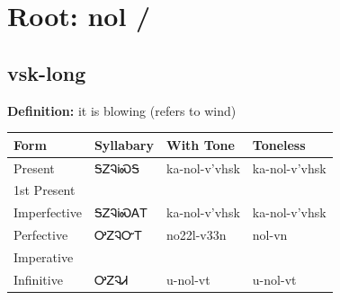 \documentclass{article}%
\begin{document}
%
\normalsize%
\section*{Root: nol / }%
\subsection*{vsk-long}%
\textbf{Definition: }%
it is blowing (refers to wind)%
\\[0.5em]%
\begin{tabular}{|l|l|l|l|}%
\hline%
\textbf{Form}&\textbf{Syllabary}&\textbf{With Tone}&\textbf{Toneless}\\%
\hline%
Present&ᎦᏃᎸᎥᏍᎦ&ka{-}nol{-}v'vhsk&ka{-}nol{-}v'vhsk\\%
1st Present&&&\\%
Imperfective&ᎦᏃᎸᎥᏍᎪᎢ&ka{-}nol{-}v'vhsk&ka{-}nol{-}v'vhsk\\%
Perfective&ᎤᏃᎸᏅᎢ&no22l{-}v33n&nol{-}vn\\%
Imperative&&&\\%
Infinitive&ᎤᏃᎸᏗ&u{-}nol{-}vt&u{-}nol{-}vt\\%
\hline%
\end{tabular}%
\\[1em]%
\end{document}

